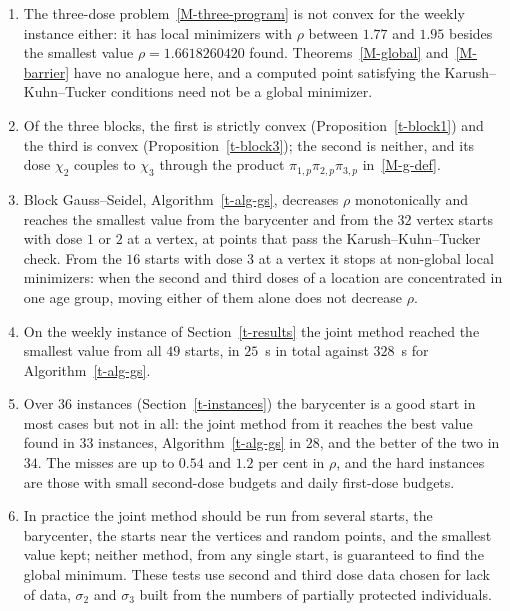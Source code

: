 \documentclass[11pt]{article}
\theoremstyle{plain}
\theoremstyle{remark}
\numberwithin{equation}{section}
\begin{document}
\begin{enumerate}
\item The three-dose problem~\eqref{M-three-program} is not convex for the
weekly instance either: it has local minimizers with $\rho$ between $1.77$ and
$1.95$ besides the smallest value $\rho=1.6618260420$ found. Theorems~\ref{M-global}
and~\ref{M-barrier} have no analogue here, and a computed point satisfying the
Karush--Kuhn--Tucker conditions need not be a global minimizer.
\item Of the three blocks, the first is strictly convex
(Proposition~\ref{t-block1}) and the third is convex
(Proposition~\ref{t-block3}); the second is neither, and its dose $\chi_2$ couples
to $\chi_3$ through the product $\pi_{1,p}\pi_{2,p}\pi_{3,p}$ in~\eqref{M-g-def}.
\item Block Gauss--Seidel, Algorithm~\ref{t-alg-gs}, decreases $\rho$ monotonically
and reaches the smallest value from the barycenter and from the $32$ vertex
starts with dose $1$ or $2$ at a vertex, at points that pass the
Karush--Kuhn--Tucker check. From the $16$ starts with dose $3$ at a vertex it
stops at non-global local minimizers: when
the second and third doses of a location are concentrated in one age group,
moving either of them alone does not decrease $\rho$.
\item On the weekly instance of Section~\ref{t-results} the joint method
reached the smallest value from all $49$ starts, in $25$~s in total against
$328$~s for Algorithm~\ref{t-alg-gs}.
\item Over $36$ instances (Section~\ref{t-instances}) the barycenter is a good
start in most cases but not in all: the joint method from it reaches the best
value found in $33$ instances, Algorithm~\ref{t-alg-gs} in $28$, and the better
of the two in $34$. The misses are up to $0.54$ and $1.2$ per cent in $\rho$,
and the hard instances are those with small second-dose budgets and daily
first-dose budgets.
\item In practice the joint method should be run from several starts, the
barycenter, the starts near the vertices and random points, and the smallest
value kept; neither method, from any single start, is guaranteed to find the
global minimum. These tests use second and third dose data chosen for lack of
data, $\sigma_2$ and $\sigma_3$ built from the numbers of partially protected
individuals.
\end{enumerate}
\end{document}
